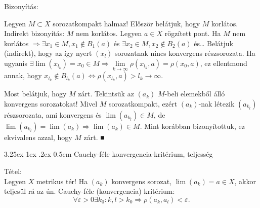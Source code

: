 \documentclass[12pt,a4paper]{scrartcl}
\makeatletter
\renewcommand\paragraph{\@startsection{paragraph}{4}{\z@}%
                                    {3.25ex \@plus1ex \@minus.2ex}%
                                    {0.5em} %
                                    {\normalfont\normalsize\bfseries}}
\newenvironment{tetel}{}{}
\newenvironment{bizonyitas}{}{}
\makeatother
\begin{document}
\begin{bizonyitas}

Bizonyítás:

Legyen \(M \subset X\) sorozatkompakt halmaz! Először belátjuk, hogy
\(M\) korlátos.\\
Indirekt bizonyítás: \(M\) nem korlátos. Legyen \(a \in X\) rögzített
pont. Ha \(M\) nem korlátos
\(\left. \Rightarrow\exists x_{1} \in M,x_{1} \notin B_{1}\left( a \right) \right.\)
és \(\exists x_{2} \in M,x_{2} \notin B_{2}\left( a \right)\) és\ldots{}
Belátjuk (indirekt), hogy az így nyert \(\left( x_{l} \right)\)
sorozatnak nincs konvergens részsorozata. Ha ugyanis
\(\left. \exists\lim\left( x_{l_{k}} \right) = x_{0} \in M\Rightarrow\underset{k\rightarrow\infty}{\lim}\rho\left( {x_{l_{k}},a} \right) = \rho\left( {x_{0},a} \right) \right.\),
ez ellentmond annak, hogy
\(\left. x_{l_{k}} \notin B_{l_{k}}\left( a \right)\Leftrightarrow\rho\left( {x_{l_{k}},a} \right) > l_{k}\rightarrow\infty \right.\).

Most belátjuk, hogy \(M\) zárt. Tekintsük az \(\left( a_{k} \right)\)
\(M\)-beli elemekből álló konvergens sorozatokat! Mivel \(M\)
sorozatkompakt, ezért \(\left( a_{k} \right)\)-nak létezik
\(\left( a_{k_{l}} \right)\) részsorozata, ami konvergens és
\(\lim\left( a_{k_{l}} \right) \in M\), de
\(\left. \lim\left( a_{k_{l}} \right) = \lim\left( a_{k} \right)\Rightarrow\lim\left( a_{k} \right) \in M \right.\).
Mint korábban bizonyítottuk, ez ekvivalens azzal, hogy \(M\) zárt. ■

\end{bizonyitas}

\hypertarget{cauchy-fuxe9le-konvergencia-krituxe9rium-teljessuxe9g}{%
\paragraph{Cauchy-féle konvergencia-kritérium,
teljesség}\label{cauchy-fuxe9le-konvergencia-krituxe9rium-teljessuxe9g}}

\begin{tetel}

Tétel:\\
Legyen \(X\) metrikus tér! Ha \(\left( a_{k} \right)\) konvergens
sorozat, \(\lim\left( a_{k} \right) = a \in X\), akkor teljesül rá az
ún. Cauchy-féle (konvergencia) kritérium:
\[\left. \forall\varepsilon > 0\exists k_{0}:k,l > k_{0}\Rightarrow\rho\left( {a_{k},a_{l}} \right) < \varepsilon. \right.\]

\end{tetel}
\end{document}
